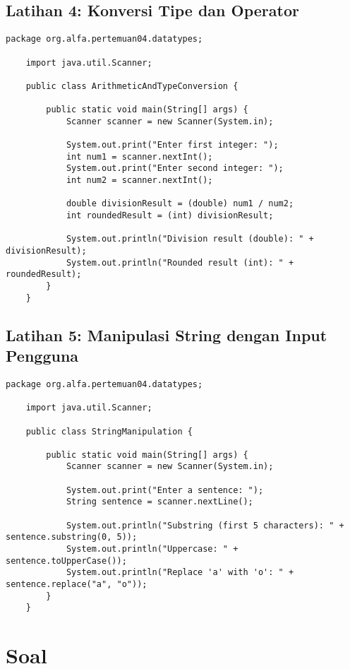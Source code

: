\subsection{Latihan 4: Konversi Tipe dan Operator}

\begin{lstlisting}[style=JavaStyle, caption={Java Code for Arithmetic and Type Conversion}]
	package org.alfa.pertemuan04.datatypes;
	
	import java.util.Scanner;
	
	public class ArithmeticAndTypeConversion {
		
		public static void main(String[] args) {
			Scanner scanner = new Scanner(System.in);
			
			System.out.print("Enter first integer: ");
			int num1 = scanner.nextInt();
			System.out.print("Enter second integer: ");
			int num2 = scanner.nextInt();
			
			double divisionResult = (double) num1 / num2;
			int roundedResult = (int) divisionResult;
			
			System.out.println("Division result (double): " + divisionResult);
			System.out.println("Rounded result (int): " + roundedResult);
		}
	}
\end{lstlisting}

\subsection{Latihan 5: Manipulasi String dengan Input Pengguna}

\begin{lstlisting}[style=JavaStyle, caption={Java Code for String Manipulation}]
	package org.alfa.pertemuan04.datatypes;
	
	import java.util.Scanner;
	
	public class StringManipulation {
		
		public static void main(String[] args) {
			Scanner scanner = new Scanner(System.in);
			
			System.out.print("Enter a sentence: ");
			String sentence = scanner.nextLine();
			
			System.out.println("Substring (first 5 characters): " + sentence.substring(0, 5));
			System.out.println("Uppercase: " + sentence.toUpperCase());
			System.out.println("Replace 'a' with 'o': " + sentence.replace("a", "o"));
		}
	}
\end{lstlisting}

\section{Soal}

